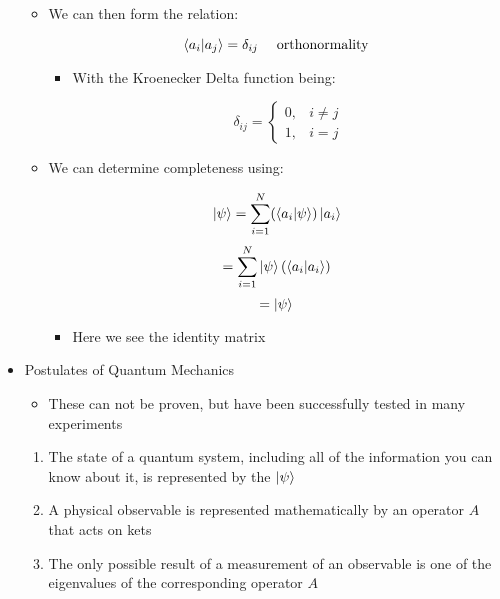 \begin{itemize}
\begin{itemize}
      \item We can then form the relation:

        $$\bra{a_i}\ket{a_j}=\delta_{ij}\quad\text{ orthonormality}$$

        \begin{itemize}

          \item With the Kroenecker Delta function being:

            $$\delta_{ij}=\left\{ \begin{array}{ll} 0,& i\neq j\\1,&i=j\end{array}$$

        \end{itemize}

      \item We can determine completeness using:

        $$\ket{\psi}=\sum_{i=1}^{N} (\bra{a_i}\ket{\psi})\ket{a_i}$$
        $$=\sum_{i=1}^{N} \ket{\psi}(\braket{a_i})$$
        $$=\ket{\psi}$$

          \begin{itemize}

            \item Here we see the identity matrix

          \end{itemize}

    \end{itemize}

  \item Postulates of Quantum Mechanics

    \begin{itemize}

      \item These can not be proven, but have been successfully tested in many experiments

    \end{itemize}

    \begin{enumerate}

      \item The state of a quantum system, including all of the information you can know about it, is represented by the $\ket{\psi}$

      \item A physical observable is represented mathematically by an operator $A$ that acts on kets

      \item The only possible result of a measurement of an observable is one of the eigenvalues of the corresponding operator $A$


\end{enumerate}
\end{itemize}
